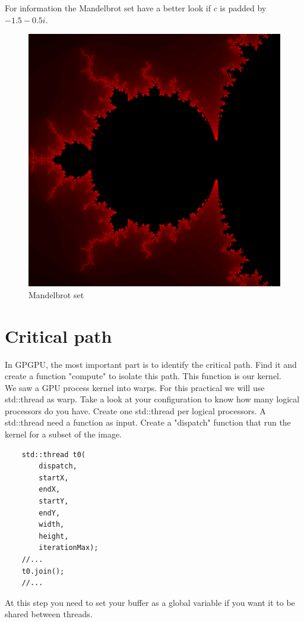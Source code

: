 \documentclass{article}
\begin{document}
For information the Mandelbrot set have a better look if $c$ is padded by $-1.5 - 0.5i$.

\begin{figure}[h]
	\centering
	\includegraphics[scale=0.4]{figures/Mandelbrot.png}
	\caption{Mandelbrot set}
\end{figure}

\newpage

\section{Critical path}
In GPGPU, the most important part is to identify the critical path. Find it and create a function "compute" to isolate this path. This function is our kernel.\\
We saw a GPU process kernel into warps. For this practical we will use std::thread as warp. Take a look at your configuration to know how many logical processors do you have. Create one std::thread per logical processors. A std::thread need a function as input. Create a "dispatch" function that run the kernel for a subset of the image. 
\begin{lstlisting}
	std::thread t0(
		dispatch,
		startX,
		endX,
		startY,
		endY,
		width,
		height,
		iterationMax);
	//...
	t0.join();
	//...
\end{lstlisting}
At this step you need to set your buffer as a global variable if you want it to be shared between threads.
\end{document}
